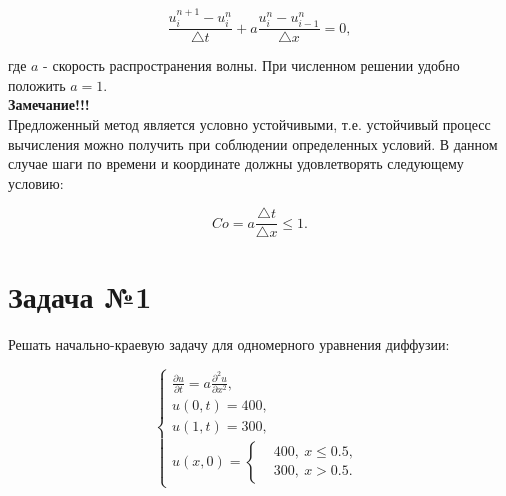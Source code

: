 \documentclass[12pt,a4paper]{article}
\begin{document}
		\begin{equation}
			\frac{u^{n+1}_{i} - u^{n}_{i}}{\triangle t} + a \frac{u^{n}_{i} - u^{n}_{i-1}}{\triangle x} = 0,
		\end{equation}

        где $a$ - скорость распространения волны. При численном решении удобно положить $a=1$.\\

		\textbf{\large Замечание!!!}\\

		Предложенный метод является условно устойчивыми, т.е. устойчивый процесс вычисления можно получить при соблюдении определенных условий. В данном случае шаги по времени и координате должны удовлетворять следующему условию:

		\begin{equation}
				Co = a \frac{\triangle t}{\triangle x} \leq 1.
		\end{equation}

	\newpage

	\section*{Задача №1}

		Решать начально-краевую задачу для одномерного уравнения диффузии:

		\begin{equation}
			\begin{cases}
				\frac{\partial u}{\partial t} = a \frac{\partial^{2} u}{\partial x^{2}}, \\
				u \left( 0, t \right) = 400, \\
				u \left( 1, t \right) = 300, \\
				u \left( x, 0 \right) =
				    \begin{cases}
						& 400, \: x \leqslant 0.5, \\
						& 300, \: x > 0.5.
					\end{cases}
			\end{cases}
		\end{equation}

        \begin{center}
        \end{center}
\end{document}
